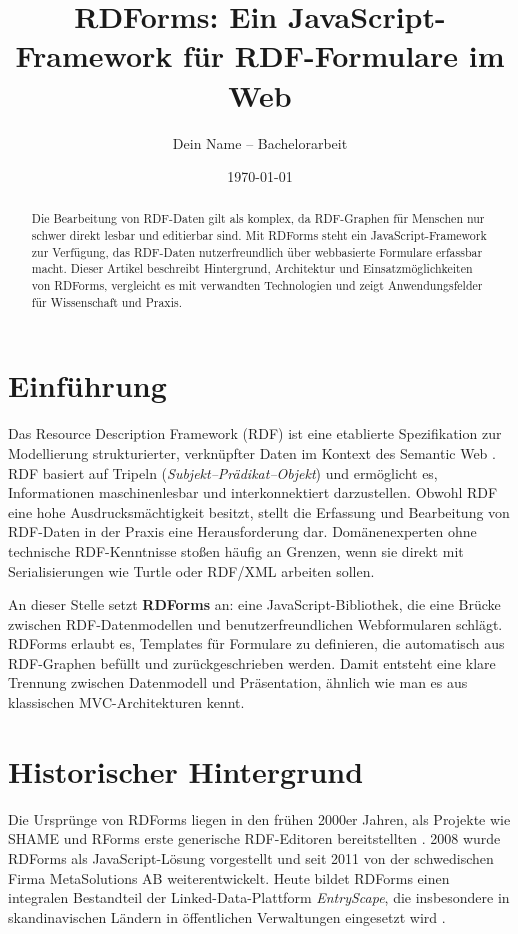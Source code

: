 \documentclass[11pt,a4paper]{article}
\title{RDForms: Ein JavaScript-Framework für RDF-Formulare im Web}
\author{Dein Name -- Bachelorarbeit}
\date{\today}
\begin{document}
\maketitle

\begin{abstract}
Die Bearbeitung von RDF-Daten gilt als komplex, da RDF-Graphen für Menschen nur schwer direkt lesbar und editierbar sind. 
Mit RDForms steht ein JavaScript-Framework zur Verfügung, das RDF-Daten nutzerfreundlich über webbasierte Formulare erfassbar macht. 
Dieser Artikel beschreibt Hintergrund, Architektur und Einsatzmöglichkeiten von RDForms, vergleicht es mit verwandten Technologien und zeigt Anwendungsfelder für Wissenschaft und Praxis. 
\end{abstract}

\section{Einführung}
Das Resource Description Framework (RDF) ist eine etablierte Spezifikation zur Modellierung strukturierter, verknüpfter Daten im Kontext des Semantic Web \cite{W3C_RDF12_Concepts}. 
RDF basiert auf Tripeln (\emph{Subjekt–Prädikat–Objekt}) und ermöglicht es, Informationen maschinenlesbar und interkonnektiert darzustellen. 
Obwohl RDF eine hohe Ausdrucksmächtigkeit besitzt, stellt die Erfassung und Bearbeitung von RDF-Daten in der Praxis eine Herausforderung dar. 
Domänenexperten ohne technische RDF-Kenntnisse stoßen häufig an Grenzen, wenn sie direkt mit Serialisierungen wie Turtle oder RDF/XML arbeiten sollen.

An dieser Stelle setzt \textbf{RDForms} an: eine JavaScript-Bibliothek, die eine Brücke zwischen RDF-Datenmodellen und benutzerfreundlichen Webformularen schlägt. 
RDForms erlaubt es, Templates für Formulare zu definieren, die automatisch aus RDF-Graphen befüllt und zurückgeschrieben werden. 
Damit entsteht eine klare Trennung zwischen Datenmodell und Präsentation, ähnlich wie man es aus klassischen MVC-Architekturen kennt.

\section{Historischer Hintergrund}
Die Ursprünge von RDForms liegen in den frühen 2000er Jahren, als Projekte wie SHAME und RForms erste generische RDF-Editoren bereitstellten \cite{RDForms_Overview}. 
2008 wurde RDForms als JavaScript-Lösung vorgestellt und seit 2011 von der schwedischen Firma MetaSolutions AB weiterentwickelt. 
Heute bildet RDForms einen integralen Bestandteil der Linked-Data-Plattform \emph{EntryScape}, die insbesondere in skandinavischen Ländern in öffentlichen Verwaltungen eingesetzt wird \cite{EntryScape_Models}. 
\end{document}

